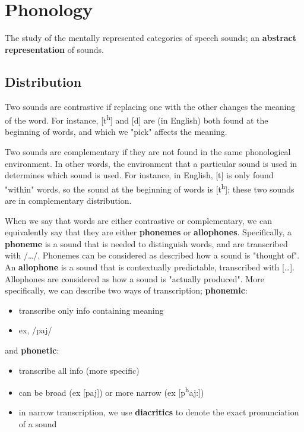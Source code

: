\documentclass[12pt]{article}
\begin{document}
\section{Phonology}
\begin{definitionEnd}[Phonology]
  The study of the mentally represented categories of speech sounds; an \textbf{abstract representation} of sounds. 
\end{definitionEnd}
\subsection{Distribution}
\begin{definitionEnd}
  Two sounds are contrastive if replacing one with the other changes the meaning of the word. For instance, [t\textsuperscript{h}] and [d] are (in English) both found at the beginning of words, and which we "pick" affects the meaning.
\end{definitionEnd}

\begin{definitionEnd}
  Two sounds are complementary if they are not found in the same phonological environment. In other words, the environment that a particular sound is used in determines which sound is used. For instance, in English, [t] is only found "within" words, so the sound at the beginning of words is [t\textsuperscript{h}]; these two sounds are in complementary distribution.
\end{definitionEnd}

When we say that words are either contrastive or complementary, we can equivalently say that they are either \textbf{phonemes} or \textbf{allophones}. Specifically, a \textbf{phoneme} is a sound that is needed to distinguish words, and are transcribed with /\dots/. Phonemes can be considered as described how a sound is "thought of". 
An \textbf{allophone} is a sound that is contextually predictable, transcribed with [\dots]. Allophones are considered as how a sound is "actually produced".
More specifically, we can describe two ways of transcription; \textbf{phonemic}:\begin{itemize}
  \item transcribe only info containing meaning
  \item ex, /paj/
\end{itemize}
and \textbf{phonetic}: \begin{itemize}
  \item transcribe all info (more specific)
  \item can be broad (ex [paj]) or more narrow (ex [p\textsuperscript{h}aj:])
  \item in narrow transcription, we use \textbf{diacritics} to denote the exact pronunciation of a sound
\end{itemize}
\end{document}
